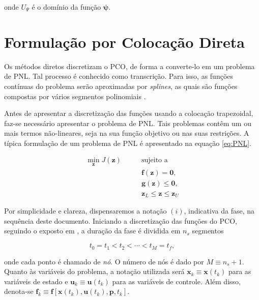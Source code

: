 \noindent onde $U_{\Psi}$ é o domínio da função $\boldsymbol{\psi}$.

\section{Formulação por Colocação Direta}
\label{sec:formulação-coloc-direta}

Os métodos diretos discretizam o PCO, de forma a converte-lo em um problema de PNL. Tal processo é conhecido como transcrição. Para isso, as funções contínuas do problema serão aproximadas por \textit{splines}, as quais são funções compostas por vários segmentos polinomiais \cite{kelly_introduction_2017}.

Antes de apresentar a discretização das funções usando a colocação trapezoidal, faz-se necessário apresentar o problema de PNL. Tais problemas contêm um ou mais termos não-lineares, seja na sua função objetivo ou nas suas restrições. A típica formulação de um problema de PNL é apresentado na equação \ref{eq:PNL}.

\begin{equation}
\label{eq:PNL}
    \begin{aligned}
        \min_\mathbf{z} J(\mathbf{z}) \qquad &\text{sujeito a} \\
        & \mathbf{f}(\mathbf{z}) = \mathbf{0}, \\
        & \mathbf{g}(\mathbf{z}) \leq \mathbf{0}, \\
        & \mathbf{z}_L \leq \mathbf{z} \leq \mathbf{z}_U
    \end{aligned}
\end{equation}

Por simplicidade e clareza, dispensaremos a notação $(i)$, indicativa da fase, na sequência deste documento. Iniciando a discretização das funções do PCO, seguindo o exposto em \cite{betts_practical_2010}, a duração da fase é dividida em $n_s$ segmentos

\begin{equation}
    \label{eq:tempo-disc}
    t_0 = t_1 < t_2 < \cdots < t_M = t_f,
\end{equation}

\noindent onde cada ponto é chamado de \textit{nó}. O número de nós é dado por $M \equiv n_s + 1$. Quanto às variáveis do problema, a notação utilizada será $\mathbf{x}_k \equiv \mathbf{x}(t_k)$ para as variáveis de estado e $\mathbf{u}_k \equiv \mathbf{u}(t_k)$ para as variáveis de controle. Além disso, denota-se $\mathbf{f}_k \equiv \mathbf{f} \left[ \mathbf{x}(t_k), \mathbf{u}(t_k), \mathbf{p}, t_k \right]$.

